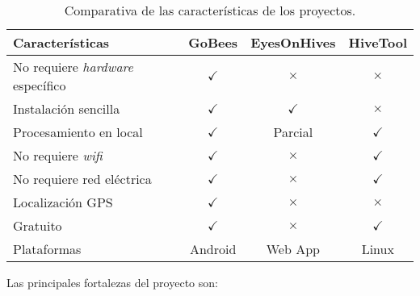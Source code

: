 \begin{table}[H]
\centering
\begin{tabular}{lccc}
\toprule
Características                 & GoBees     & EyesOnHives & HiveTool   \\
\midrule
No requiere \emph{hardware} específico & \cellcolor{green!25} {$\checkmark$} & \cellcolor{red!25} {$\times$} & \cellcolor{red!25} {$\times$} \\
Instalación sencilla            & \cellcolor{green!25} {$\checkmark$} & \cellcolor{green!25} {$\checkmark$}  & \cellcolor{red!25} {$\times$} \\
Procesamiento en local          & \cellcolor{green!25} {$\checkmark$} & \cellcolor{yellow!25} Parcial & \cellcolor{green!25} {$\checkmark$}  \\
No requiere \emph{wifi}         & \cellcolor{green!25} {$\checkmark$} & \cellcolor{red!25} {$\times$} & \cellcolor{green!25} {$\checkmark$}  \\
No requiere red eléctrica       & \cellcolor{green!25} {$\checkmark$} & \cellcolor{red!25} {$\times$}  & \cellcolor{green!25} {$\checkmark$}  \\
Localización GPS                & \cellcolor{green!25} {$\checkmark$} & \cellcolor{red!25} {$\times$} & \cellcolor{red!25} {$\times$}        \\
Gratuito                        & \cellcolor{green!25} {$\checkmark$} & \cellcolor{red!25} {$\times$}  & \cellcolor{green!25} {$\checkmark$}  \\
Plataformas                     & Android    & Web App     & Linux     \\
\bottomrule
\end{tabular}
\caption{Comparativa de las características de los proyectos.}
\label{comparativa-proyectos}
\end{table}

Las principales fortalezas del proyecto son:

